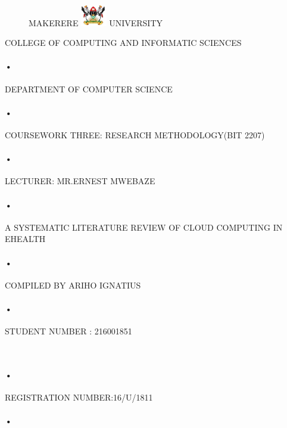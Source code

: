 \documentclass[10pt,a4paper]{article}
\begin{document}
\begin{titlepage}
 \begin{figure}[h]
  \centerline{\small MAKERERE 
  \includegraphics[width=0.1\textwidth]{muklog} UNIVERSITY}
\end{figure}
\centerline{COLLEGE OF COMPUTING AND INFORMATIC SCIENCES}
\paragraph{•}
\centerline{DEPARTMENT OF COMPUTER SCIENCE\\}
\paragraph{•}

\centerline{COURSEWORK THREE: RESEARCH METHODOLOGY(BIT 2207)\\}
\paragraph{•}
\centerline{LECTURER: MR.ERNEST MWEBAZE}
\paragraph{•}
\centerline{A SYSTEMATIC LITERATURE REVIEW OF CLOUD COMPUTING IN EHEALTH\\}
\paragraph{•}
\centerline{COMPILED BY
 ARIHO IGNATIUS}
 \paragraph{•}
\centerline{STUDENT NUMBER : 216001851}\
\paragraph{•}
\centerline{REGISTRATION NUMBER:16/U/1811}
\paragraph{•}
\end{titlepage}
\tableofcontents
\newpage
{}
\end{document}

